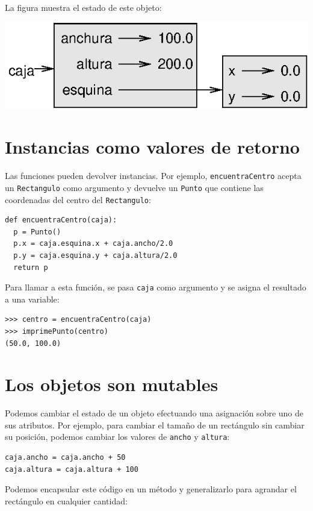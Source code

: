 La figura muestra el estado de este objeto:

\beforefig \centerline{\includegraphics{illustrations/rectangle}}
\afterfig

\section{Instancias como valores de retorno}

 

Las funciones pueden devolver instancias. Por ejemplo, \texttt{encuentraCentro}
acepta un \texttt{Rectangulo} como argumento y devuelve un \texttt{Punto}
que contiene las coordenadas del centro del \texttt{Rectangulo}:
\begin{verbatim}
def encuentraCentro(caja):
  p = Punto()
  p.x = caja.esquina.x + caja.ancho/2.0
  p.y = caja.esquina.y + caja.altura/2.0
  return p
\end{verbatim}

Para llamar a esta función, se pasa \texttt{caja} como argumento y
se asigna el resultado a una variable:
\begin{verbatim}
>>> centro = encuentraCentro(caja)
>>> imprimePunto(centro)
(50.0, 100.0)
\end{verbatim}

\section{Los objetos son mutables}

 

Podemos cambiar el estado de un objeto efectuando una asignación sobre
uno de sus atributos. Por ejemplo, para cambiar el tamaño de un rectángulo
sin cambiar su posición, podemos cambiar los valores de \texttt{ancho}
y \texttt{altura}:
\begin{verbatim}
caja.ancho = caja.ancho + 50
caja.altura = caja.altura + 100
\end{verbatim}

Podemos encapsular este código en un método y generalizarlo para agrandar
el rectángulo en cualquier cantidad:

